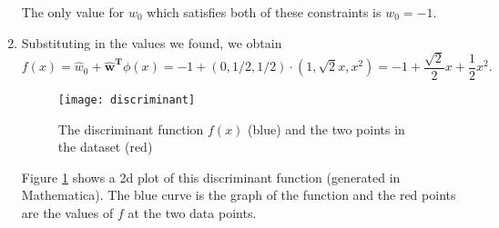 \documentclass{article}
\begin{document}
\begin{enumerate}
	The only value for $w_0$ which satisfies both of these constraints is $w_0=-1$.
	\item Substituting in the values we found, we obtain
	\[
		f(x) = \hat w_0 + \bm{\hat w^T}\phi(x) = -1 + (0,1/2,1/2)\cdot(1,\sqrt{2}x,x^2) = -1 + \frac{\sqrt{2}}{2}x+\frac12x^2.
	\]
	\begin{figure}
        \centering
        \texttt{[image: discriminant]}
        \caption{The discriminant function $f(x)$ (blue) and the two points in the dataset (red)} 
        \label{fig:discr}
    \end{figure}
    Figure \ref{fig:discr} shows a 2d plot of this discriminant function (generated in Mathematica). The blue curve is the graph of the function and the red points are the values of $f$ at the two data points.
\end{enumerate}
\end{document}
